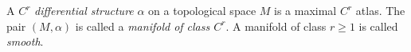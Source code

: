 A $C^r$ \textit{differential structure} $\alpha$ on a topological space $M$ is a maximal $C^r$ atlas. The pair $(M, \alpha)$ is called a \textit{manifold of class $C^r$}. A manifold of class $r \geqslant 1$ is called \textit{smooth}.
